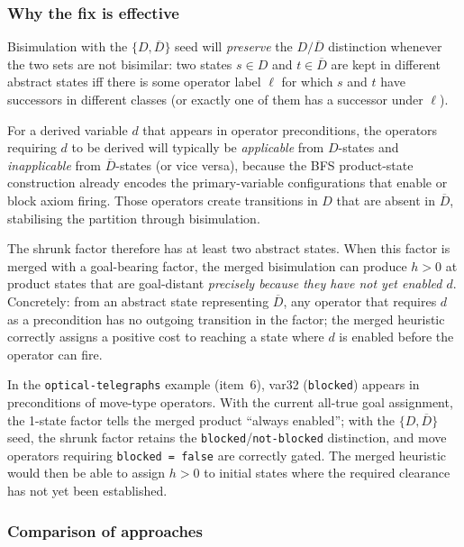 \documentclass[11pt,a4paper]{article}
\begin{document}
\begin{enumerate}
    \subsubsection*{Why the fix is effective}

    Bisimulation with the $\{D, \overline{D}\}$ seed will \emph{preserve}
    the $D / \overline{D}$ distinction whenever the two sets are not
    bisimilar: two states $s \in D$ and $t \in \overline{D}$ are kept in
    different abstract states iff there is some operator label $\ell$ for
    which $s$ and $t$ have successors in different classes (or exactly one
    of them has a successor under $\ell$).

    For a derived variable $d$ that appears in operator preconditions, the
    operators requiring $d$ to be derived will typically be \emph{applicable}
    from $D$-states and \emph{inapplicable} from $\overline{D}$-states (or
    vice versa), because the BFS product-state construction already encodes
    the primary-variable configurations that enable or block axiom firing.
    Those operators create transitions in $D$ that are absent in $\overline{D}$,
    stabilising the partition through bisimulation.

    The shrunk factor therefore has at least two abstract states.  When this
    factor is merged with a goal-bearing factor, the merged bisimulation can
    produce $h > 0$ at product states that are goal-distant \emph{precisely
    because they have not yet enabled $d$}.  Concretely: from an abstract
    state representing $\overline{D}$, any operator that requires $d$ as a
    precondition has no outgoing transition in the factor; the merged
    heuristic correctly assigns a positive cost to reaching a state where $d$
    is enabled before the operator can fire.

    In the \texttt{optical-telegraphs} example (item~6), var32 (\texttt{blocked})
    appears in preconditions of move-type operators.  With the current all-true
    goal assignment, the 1-state factor tells the merged product ``always
    enabled''; with the $\{D, \overline{D}\}$ seed, the shrunk factor retains
    the \texttt{blocked}/\texttt{not-blocked} distinction, and move operators
    requiring \texttt{blocked = false} are correctly gated.  The merged
    heuristic would then be able to assign $h > 0$ to initial states where
    the required clearance has not yet been established.

    \subsubsection*{Comparison of approaches}


\end{enumerate}
\end{document}
